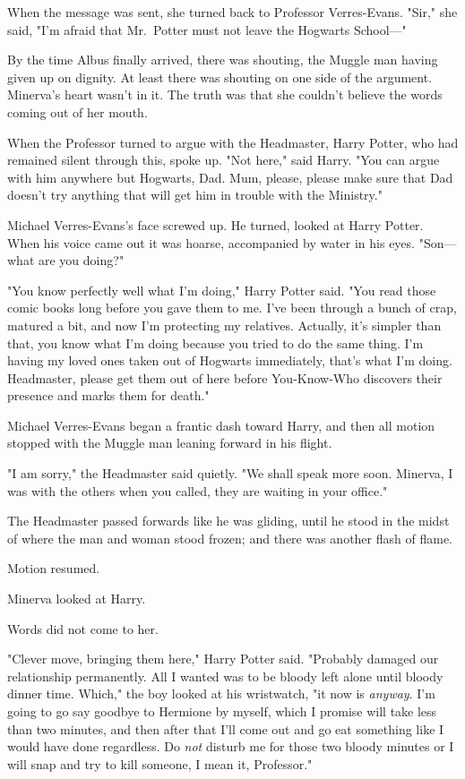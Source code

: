 When the message was sent, she turned back to Professor Verres-Evans. "Sir,"
she said, "I'm afraid that Mr.~Potter must not leave the Hogwarts School---"

By the time Albus finally arrived, there was shouting, the Muggle man having
given up on dignity. At least there was shouting on one side of the argument.
Minerva's heart wasn't in it. The truth was that she couldn't believe the words
coming out of her mouth.

When the Professor turned to argue with the Headmaster, Harry Potter, who had
remained silent through this, spoke up. "Not here," said Harry. "You can argue
with him anywhere but Hogwarts, Dad. Mum, please, please make sure that Dad
doesn't try anything that will get him in trouble with the Ministry."

Michael Verres-Evans's face screwed up. He turned, looked at Harry Potter. When
his voice came out it was hoarse, accompanied by water in his eyes. "Son---what
are you doing?"

"You know perfectly well what I'm doing," Harry Potter said. "You read those
comic books long before you gave them to me. I've been through a bunch of crap,
matured a bit, and now I'm protecting my relatives. Actually, it's simpler than
that, you know what I'm doing because you tried to do the same thing. I'm
having my loved ones taken out of Hogwarts immediately, that's what I'm doing.
Headmaster, please get them out of here before You-Know-Who discovers their
presence and marks them for death."

Michael Verres-Evans began a frantic dash toward Harry, and then all motion
stopped with the Muggle man leaning forward in his flight.

"I am sorry," the Headmaster said quietly. "We shall speak more soon. Minerva,
I was with the others when you called, they are waiting in your office."

The Headmaster passed forwards like he was gliding, until he stood in the midst
of where the man and woman stood frozen; and there was another flash of flame.

Motion resumed.

Minerva looked at Harry.

Words did not come to her.

"Clever move, bringing them here," Harry Potter said. "Probably damaged our
relationship permanently. All I wanted was to be bloody left alone until bloody
dinner time. Which," the boy looked at his wristwatch, "it now is \emph{anyway}.
I'm going to go say goodbye to Hermione by myself, which I promise will take
less than two minutes, and then after that I'll come out and go eat something
like I would have done regardless. Do \emph{not} disturb me for those two
bloody minutes or I will snap and try to kill someone, I mean it, Professor."

